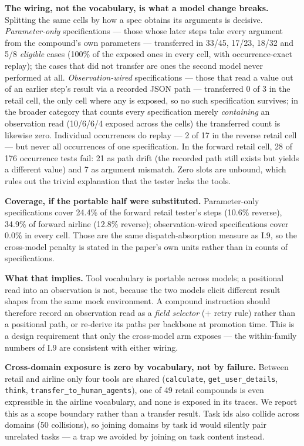 \documentclass[
  11pt,
]{article}
\newcounter{none} %
\begin{document}
\textbf{The wiring, not the vocabulary, is what a model change breaks.}
Splitting the same cells by how a spec obtains its arguments is
decisive. \emph{Parameter-only} specifications --- those whose later
steps take every argument from the compound's own parameters ---
transferred in 33/45, 17/23, 18/32 and 5/8 \emph{eligible} cases (100\%
of the exposed ones in every cell, with occurrence-exact replay); the
cases that did not transfer are ones the second model never performed at
all. \emph{Observation-wired} specifications --- those that read a value
out of an earlier step's result via a recorded JSON path --- transferred
0 of 3 in the retail cell, the only cell where any is exposed, so no
such specification survives; in the broader category that counts every
specification merely \emph{containing} an observation read (10/6/6/4
exposed across the cells) the transferred count is likewise zero.
Individual occurrences do replay --- 2 of 17 in the reverse retail cell
--- but never all occurrences of one specification. In the forward
retail cell, 28 of 176 occurrence tests fail: 21 as path drift (the
recorded path still exists but yields a different value) and 7 as
argument mismatch. Zero slots are unbound, which rules out the trivial
explanation that the tester lacks the tools.

\textbf{Coverage, if the portable half were substituted.} Parameter-only
specifications cover 24.4\% of the forward retail tester's steps (10.6\%
reverse), 34.9\% of forward airline (12.8\% reverse); observation-wired
specifications cover 0.0\% in every cell. Those are the same
dispatch-absorption measure as I.9, so the cross-model penalty is stated
in the paper's own units rather than in counts of specifications.

\textbf{What that implies.} Tool vocabulary is portable across models; a
positional read into an observation is not, because the two models
elicit different result shapes from the same mock environment. A
compound instruction should therefore record an observation read as a
\emph{field selector} (+ retry rule) rather than a positional path, or
re-derive its paths per backbone at promotion time. This is a design
requirement that only the cross-model arm exposes --- the within-family
numbers of I.9 are consistent with either wiring.

\textbf{Cross-domain exposure is zero by vocabulary, not by failure.}
Between retail and airline only four tools are shared
(\texttt{calculate}, \texttt{get\_user\_details}, \texttt{think},
\texttt{transfer\_to\_human\_agents}), one of 49 retail compounds is
even expressible in the airline vocabulary, and none is exposed in its
traces. We report this as a scope boundary rather than a transfer
result. Task ids also collide across domains (50 collisions), so joining
domains by task id would silently pair unrelated tasks --- a trap we
avoided by joining on task content instead.
\end{document}
